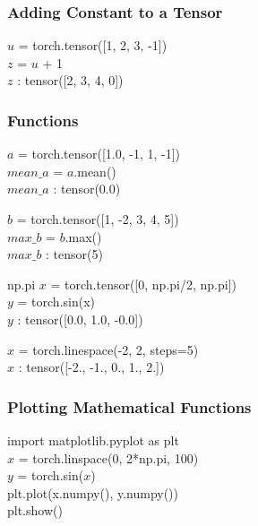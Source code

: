 \documentclass[14 pt]{beamer}
\begin{document}
\begin{frame}
  \frametitle{Adding Constant to a Tensor}
  \begin{block}{}
    $u$ = torch.tensor([1, 2, 3, -1]) \\
    $z$ = $u$  + 1 \\
    $z$ : tensor([2, 3, 4, 0])
  \end{block}
\end{frame}

\begin{frame}
  \frametitle{Functions}
  \begin{block}{}
    $a$ = torch.tensor([1.0, -1, 1, -1]) \\
    $mean\_a$ = $a$.mean() \\
    $mean\_a$ : tensor(0.0)
  \end{block}

  \begin{block}{}
    $b$ = torch.tensor([1, -2, 3, 4, 5]) \\
    $max\_b$ = $b$.max() \\
    $max\_b$ : tensor(5)
  \end{block}

  \begin{block}{np.pi}
    $x$ = torch.tensor([0, np.pi/2, np.pi]) \\
    $y$ = torch.sin(x) \\
    $y$ : tensor([0.0, 1.0, -0.0])
  \end{block}
\end{frame}

\begin{frame}
  \begin{block}{}
    $x$ = torch.linespace(-2, 2, steps=5) \\
    $x$ : tensor([-2., -1., 0., 1., 2.]) \\
  \end{block}
\end{frame}
\begin{frame}
  \frametitle{Plotting Mathematical Functions}
  \begin{block}{}
    import matplotlib.pyplot as plt \\

    $x$ = torch.linspace(0, 2*np.pi, 100) \\
    $y$ = torch.sin($x$) \\
    plt.plot(x.numpy(), y.numpy()) \\
    plt.show()
  \end{block}
\end{frame}
\end{document}
